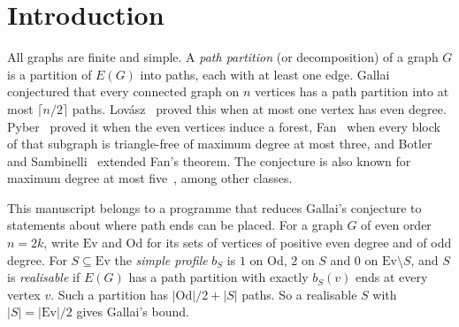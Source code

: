 \documentclass[11pt]{amsart}
\theoremstyle{definition}
\newcommand{\Ev}{\mathrm{Ev}}
\newcommand{\Od}{\mathrm{Od}}
\begin{document}
\begin{abstract}
\begin{itemize}
constrained conjectures. The proof attaches a leaf at $c$, which makes $c$ the only even vertex and puts
the leaf at distance three from $a$.
\end{itemize}
We also prove TRC for two classes reachable by Fan's lemma, state the constrained Lov\'asz conjectures that
would give TRC for minimum $T$-joins, and record what we know of their status. One of them would imply
Gallai's conjecture for every graph whose even vertices induce a subgraph with a perfect matching. The
proofs use no computation. Computations (an exact oracle, about $1.6\times10^5$ transversals and
$6\times10^5$ extension queries) are reported separately and only guided the statements. The
separation theorem and its one-pair corollary, the vertex-set form of Fan's lemma, the extension step
of route descent, the reduction of TRC to constrained Lov\'asz decompositions, and the resulting
reduction of Gallai's conjecture are formalised in Lean.
\end{abstract}
\maketitle

\section{Introduction}\label{sec:intro}

All graphs are finite and simple. A \emph{path partition} (or decomposition) of a graph $G$ is a partition
of $E(G)$ into paths, each with at least one edge. Gallai conjectured that every connected graph on $n$
vertices has a path partition into at most $\lceil n/2\rceil$ paths. Lov\'asz~\cite{L68} proved this when
at most one vertex has even degree. Pyber~\cite{Pyb96} proved it when the even vertices induce a forest,
Fan~\cite{Fan05} when every block of that subgraph is triangle-free of maximum degree at most three,
and Botler and Sambinelli~\cite{BS21} extended Fan's theorem. The conjecture is also known for maximum
degree at most five~\cite{BP19}, among other classes.

This manuscript belongs to a programme that reduces Gallai's conjecture to statements about where path
ends can be placed. For a graph $G$ of even order $n=2k$, write $\Ev$ and $\Od$ for its sets of
vertices of positive even degree and of odd degree. For $S\subseteq\Ev$ the \emph{simple profile} $b_S$ is
$1$ on $\Od$, $2$ on $S$ and $0$ on $\Ev\setminus S$, and $S$ is \emph{realisable} if $E(G)$ has a path
partition with exactly $b_S(v)$ ends at every vertex $v$. Such a partition has $|\Od|/2+|S|$ paths. So a
realisable $S$ with $|S|=|\Ev|/2$ gives Gallai's bound.
\end{document}

